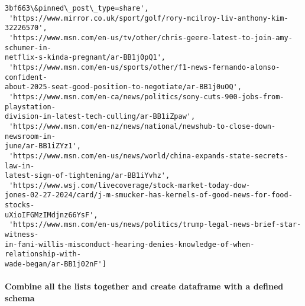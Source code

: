 \documentclass[11pt]{article}
\begin{document}
\begin{tcolorbox}[breakable, size=fbox, boxrule=.5pt, pad at break*=1mm, opacityfill=0]
\begin{Verbatim}[commandchars=\\\{\}]
3bf663\&pinned\_post\_type=share',
 'https://www.mirror.co.uk/sport/golf/rory-mcilroy-liv-anthony-kim-32226570',
 'https://www.msn.com/en-us/tv/other/chris-geere-latest-to-join-amy-schumer-in-
netflix-s-kinda-pregnant/ar-BB1j0pQ1',
 'https://www.msn.com/en-us/sports/other/f1-news-fernando-alonso-confident-
about-2025-seat-good-position-to-negotiate/ar-BB1j0uOQ',
 'https://www.msn.com/en-ca/news/politics/sony-cuts-900-jobs-from-playstation-
division-in-latest-tech-culling/ar-BB1iZpaw',
 'https://www.msn.com/en-nz/news/national/newshub-to-close-down-newsroom-in-
june/ar-BB1iZYz1',
 'https://www.msn.com/en-us/news/world/china-expands-state-secrets-law-in-
latest-sign-of-tightening/ar-BB1iYvhz',
 'https://www.wsj.com/livecoverage/stock-market-today-dow-
jones-02-27-2024/card/j-m-smucker-has-kernels-of-good-news-for-food-stocks-
uXioIFGMzIMdjnz66YsF',
 'https://www.msn.com/en-us/news/politics/trump-legal-news-brief-star-witness-
in-fani-willis-misconduct-hearing-denies-knowledge-of-when-relationship-with-
wade-began/ar-BB1j02nF']
\end{Verbatim}
\end{tcolorbox}
        
    \hypertarget{combine-all-the-lists-together-and-create-dataframe-with-a-defined-schema}{%
\paragraph{\texorpdfstring{\textbf{Combine all the lists together and
create dataframe with a defined
schema}}{Combine all the lists together and create dataframe with a defined schema}}\label{combine-all-the-lists-together-and-create-dataframe-with-a-defined-schema}}
\end{document}
